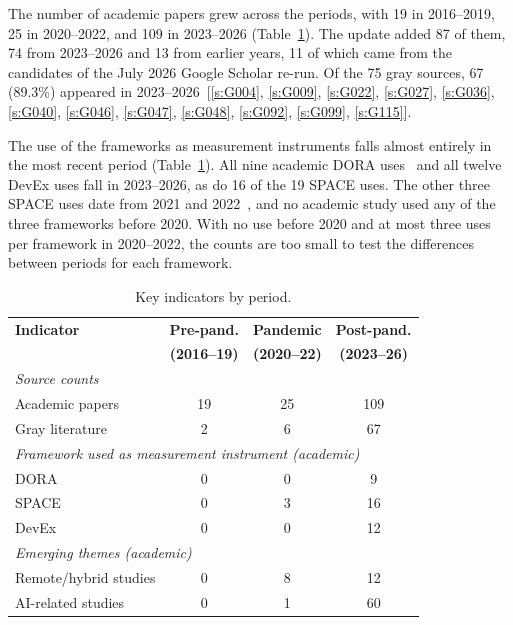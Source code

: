 \documentclass[preprint,number]{elsarticle}
\newcounter{study}
\newcommand{\refG}[1]{\ref{s:#1}}
\begin{document}
The number of academic papers grew across the periods, with 19 in 2016--2019, 25 in 2020--2022, and 109 in 2023--2026 (Table~\ref{tab:temporal_detail}). The update added 87 of them, 74 from 2023--2026 and 13 from earlier years, 11 of which came from the candidates of the July 2026 Google Scholar re-run. Of the 75 gray sources, 67 (89.3\%) appeared in 2023--2026~[\refG{G004}, \refG{G009}, \refG{G022}, \refG{G027}, \refG{G036}, \refG{G040}, \refG{G046}, \refG{G047}, \refG{G048}, \refG{G092}, \refG{G099}, \refG{G115}].

The use of the frameworks as measurement instruments falls almost entirely in the most recent period (Table~\ref{tab:temporal_detail}). All nine academic DORA uses~\cite{P0470, P0003, P1261, P2008, P2013, P2014, P2017, P2026, P2043} and all twelve DevEx uses fall in 2023--2026, as do 16 of the 19 SPACE uses. The other three SPACE uses date from 2021 and 2022~\cite{P1259, P0061, P0549}, and no academic study used any of the three frameworks before 2020. With no use before 2020 and at most three uses per framework in 2020--2022, the counts are too small to test the differences between periods for each framework.

\begin{table}[htbp]
\centering
\caption{Key indicators by period.}
\label{tab:temporal_detail}
\footnotesize
\begin{tabular}{l c c c}
\toprule
\textbf{Indicator} & \textbf{Pre-pand.} & \textbf{Pandemic} & \textbf{Post-pand.} \\
 & \textbf{(2016--19)} & \textbf{(2020--22)} & \textbf{(2023--26)} \\
\midrule
\multicolumn{4}{l}{\textit{Source counts}} \\
\quad Academic papers & 19 & 25 & 109 \\
\quad Gray literature & 2  & 6  & 67 \\
\midrule
\multicolumn{4}{l}{\textit{Framework used as measurement instrument (academic)}} \\
\quad DORA  & 0 & 0 & 9 \\
\quad SPACE & 0 & 3 & 16 \\
\quad DevEx & 0 & 0 & 12 \\
\midrule
\multicolumn{4}{l}{\textit{Emerging themes (academic)}} \\
\quad Remote/hybrid studies & 0 & 8 & 12 \\
\quad AI-related studies  & 0 & 1 & 60 \\
\bottomrule
\end{tabular}
\end{table}
\end{document}
